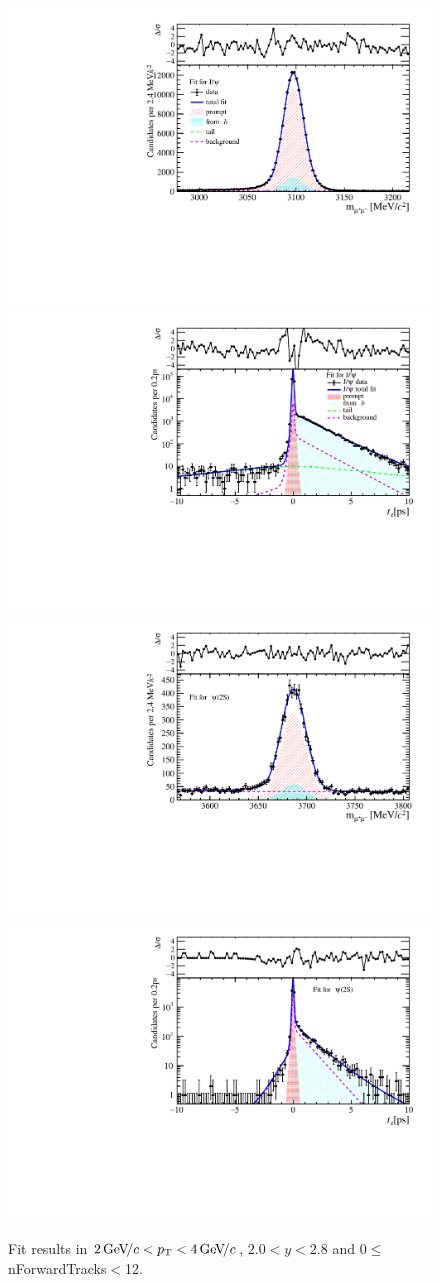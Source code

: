\begin{figure}[H]
\begin{center}
\includegraphics[width=0.47\linewidth]{pdf/Jpsi/drawmassF/n1y1pt2.pdf}
\includegraphics[width=0.47\linewidth]{pdf/Jpsi/2DFitF/n1y1pt2.pdf}
\vspace*{-0.5cm}
\includegraphics[width=0.47\linewidth]{pdf/Psi2S/drawmassF/n1y1pt2.pdf}
\includegraphics[width=0.47\linewidth]{pdf/Psi2S/2DFitF/n1y1pt2.pdf}
\vspace*{-0.5cm}
\end{center}
\caption{Fit results in $2\text{\,Ge\kern -0.1em V\!/}c<p_{\mathrm{T}}<4\text{\,Ge\kern -0.1em V\!/}c$, $2.0<y<2.8$ and 0$\leq$nForwardTracks$<$12.}
\label{Fitn1y1pt2}
\end{figure}
